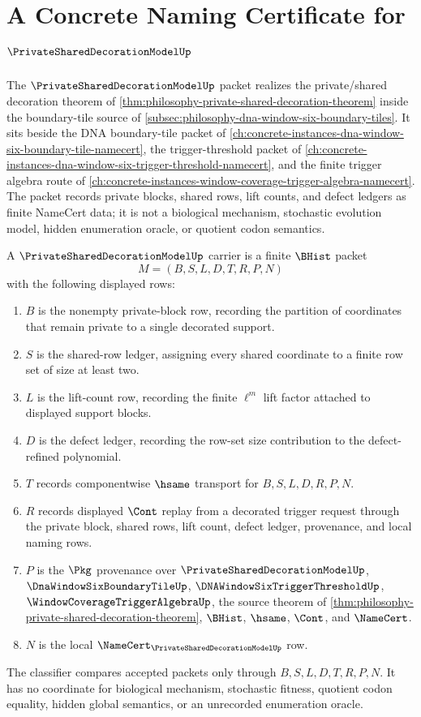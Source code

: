 \chapter{A Concrete Naming Certificate for $\PrivateSharedDecorationModelUp$}
\label{ch:concrete-instances-private-shared-decoration-model-namecert}

The $\PrivateSharedDecorationModelUp$ packet realizes the private/shared decoration theorem of \autoref{thm:philosophy-private-shared-decoration-theorem} inside the boundary-tile source of \autoref{subsec:philosophy-dna-window-six-boundary-tiles}. It sits beside the DNA boundary-tile packet of \autoref{ch:concrete-instances-dna-window-six-boundary-tile-namecert}, the trigger-threshold packet of \autoref{ch:concrete-instances-dna-window-six-trigger-threshold-namecert}, and the finite trigger algebra route of \autoref{ch:concrete-instances-window-coverage-trigger-algebra-namecert}. The packet records private blocks, shared rows, lift counts, and defect ledgers as finite NameCert data; it is not a biological mechanism, stochastic evolution model, hidden enumeration oracle, or quotient codon semantics.

\begin{definition}
\label{def:private-shared-decoration-model-carrier}
A $\PrivateSharedDecorationModelUp$ carrier is a finite $\BHist$ packet
$$
M=(B,S,L,D,T,R,P,N)
$$
with the following displayed rows:
\begin{enumerate}
\item $B$ is the nonempty private-block row, recording the partition of coordinates that remain private to a single decorated support.
\item $S$ is the shared-row ledger, assigning every shared coordinate to a finite row set of size at least two.
\item $L$ is the lift-count row, recording the finite $\ell^{m}$ lift factor attached to displayed support blocks.
\item $D$ is the defect ledger, recording the row-set size contribution to the defect-refined polynomial.
\item $T$ records componentwise $\hsame$ transport for $B,S,L,D,R,P,N$.
\item $R$ records displayed $\Cont$ replay from a decorated trigger request through the private block, shared rows, lift count, defect ledger, provenance, and local naming rows.
\item $P$ is the $\Pkg$ provenance over $\PrivateSharedDecorationModelUp$, $\DnaWindowSixBoundaryTileUp$, $\DNAWindowSixTriggerThresholdUp$, $\WindowCoverageTriggerAlgebraUp$, the source theorem of \autoref{thm:philosophy-private-shared-decoration-theorem}, $\BHist$, $\hsame$, $\Cont$, and $\NameCert$.
\item $N$ is the local $\NameCert_{\PrivateSharedDecorationModelUp}$ row.
\end{enumerate}
The classifier compares accepted packets only through $B,S,L,D,T,R,P,N$. It has no coordinate for biological mechanism, stochastic fitness, quotient codon equality, hidden global semantics, or an unrecorded enumeration oracle.
\end{definition}

